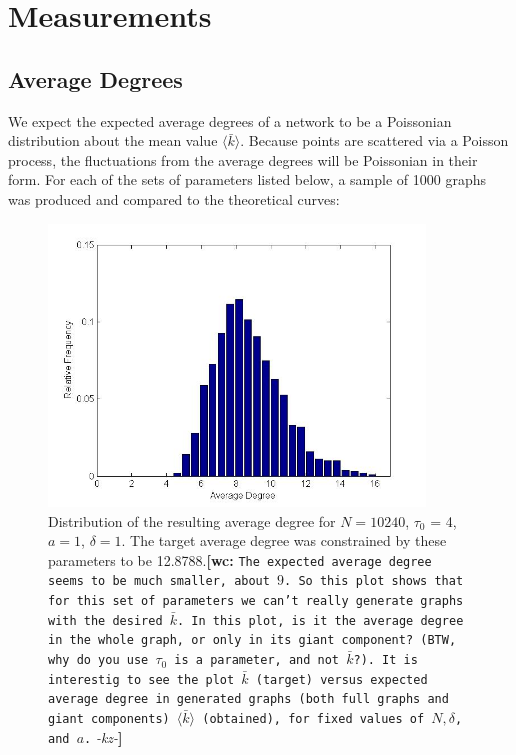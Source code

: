 \documentclass[preprint,notitlepage,amsmath,amssymb,floatfix]{revtex4-1}
\newcommand{\XXX}[3]{{\bf [#1: } {\tt #3} {\it -#2-}{\bf ]}}
\begin{document}
\section{Measurements}
\subsection{Average Degrees}
We expect the expected average degrees of a network to be a Poissonian distribution about the mean value $\langle\bar{k}\rangle$.  
Because points are scattered via a Poisson process, the fluctuations from the average degrees will be Poissonian in their form.  
For each of the sets of parameters listed below, a sample of 1000 graphs was produced and compared to the theoretical curves:


\begin{figure}
\includegraphics[width=10cm]{figures/Average_Degree.jpg}
\caption{Distribution of the resulting average degree for $N = 10240$, $\tau_0$ = 4, $a = 1$, $\delta = 1$.  The target average degree was constrained by these parameters to be 12.8788.\XXX{wc}{kz}{The expected average degree seems to be much smaller, about $9$. So this plot shows that for this set of parameters we can't really generate graphs with the desired $\bar{k}$. In this plot, is it the average degree in the whole graph, or only in its giant component? (BTW, why do you use $\tau_0$ is a parameter, and not $\bar{k}$?). It is interestig to see the plot $\bar{k}$ (target) versus expected average degree in generated graphs (both full graphs and giant components) $\langle\bar{k}\rangle$ (obtained), for fixed values of $N, \delta$, and $a$.} }
\label{fig:avg_deg_uni}
\centering
\end{figure}
\end{document}
